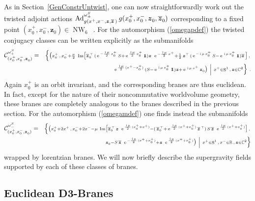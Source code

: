 \documentclass[11pt,a4paper]{article}
\DeclareMathOperator{\Sphere}{S}
\DeclareMathOperator{\NW}{NW}
\let\S\Sphere
\newcommand{\ii}{{\rm i}}
\newcommand{\mbf}[1]{{\boldsymbol {#1} }}
\def\ii{{\,{\rm i}\,}}
\def\mz{{\mbf z}}
\newcommand{\complex}{{\mathbb C}} %
\newcommand{\real}{{\mathbb R}} %
\newcommand{\id}{{1\!\!1}} %
\def\e{{\,\rm e}\,}
\def\bea{\begin{eqnarray}}
\def\eea{\end{eqnarray}}
\begin{document}
As in Section~\ref{GenConstrUntwist}, one can now straightforwardly work
out the twisted adjoint actions ${\rm
Ad}^{\omega_\pm^S}_{g(x^+,x^-,\mz,\overline{\mz}\,)}\,g(x^+_0,x^-_0,\mz^{~}_0,
\overline{\mz}^{~}_0)$ corresponding to a fixed point
$(x_0^+,x_0^-,\mz^{~}_0)\in\NW_6$~\cite{FS1,SF1}. For the automorphism
(\ref{omegapdef}) the twisted conjugacy
classes can be written explicitly as the submanifolds
\bea
\mathcal{C}^{\omega_+^S}_{(x_0^+,x^-_0,\mz^{~}_0)}&=&
\scriptstyle{\Bigl\{\bigl(x^+_0\,,\,x^-_0+\frac\mu2
{}~{\rm
  Im}\bigl[\overline{\mz}{}_0^{\,\top}\,(\e^{-\frac{\ii\mu}2\,x_0^+}
\,S+\e^{\frac{\ii\mu}2\,x_0^+}\,\id)\mz~\e^{-\frac{\ii\mu}2\,x^+}+
\frac12\,\mz^\top\,(\e^{-\ii\mu\,x_0^+}\,S-\e^{\ii\mu\,x_0^+}\,\id)
\overline{\mz}\,\bigr]}\,,\,\bigr.\Bigr.\nonumber\\&&~~~~~
\scriptstyle{\left.\Bigl.\bigl.
\e^{\frac{\ii\mu}2\,(x^+-x_0^+)}\,(S-\e^{\ii\mu\,x_0^+}\,\id)\mz+
\e^{\ii\mu\,x^+}\,\mz^{~}_0
\bigr)~\right|~x^+\in\S^1\,,\,\mz\in\complex^2\Bigr\}} \ .
\label{conjclassgenp}\eea
Again $x_0^+$ is an orbit invariant, and the corresponding branes are
thus euclidean. In fact, except for the nature of their noncommutative
worldvolume geometry, these branes are completely analogous to the
branes described in the previous section. For the automorphism
(\ref{omegamdef}) one finds instead the submanifolds
\bea
\mathcal{C}^{\omega_-^S}_{(x_0^+,x^-_0,\mz^{~}_0)}&=&
\scriptstyle{\Bigl\{\bigl(x^+_0+2x^+\,,\,x^-_0+2x^--\mu
{}~{\rm
  Im}\bigl[\overline{\mz}{}_0^{\,\top}\,\mz~\e^{\frac{\ii\mu}2\,
(x_0^++x^+)}-(\,\overline{\mz}{}_0^{\,\top}+
\e^{\frac{\ii\mu}2\,(x^++x_0^+)}\,\overline{\mz}^{\,\top})\,S
\,\overline{\mz}~\e^{\frac{\ii\mu}2\,(x^++x_0^+)}
\bigr]\,,\,\bigr.\Bigr.}\nonumber\\&&~~~~~\scriptstyle{\left.\Bigl.\bigl.
\mz^{~}_0-S\,\overline{\mz}~\e^{-\frac{\ii\mu}2\,(x^++x_0^+)}+\mz~
\e^{\frac{\ii\mu}2\,(x^++x_0^+)}
\bigr)~\right|~x^+\in\S^1\,,\,x^-\in\real\,,\,\mz\in\complex^2\Bigr\}}
\label{conjclassgenm}\eea
wrapped by lorentzian branes. We will now briefly describe the
supergravity fields supported by each of these classes of branes.

\subsection{Euclidean D3-Branes\label{EuclD3Twist}}
\end{document}
